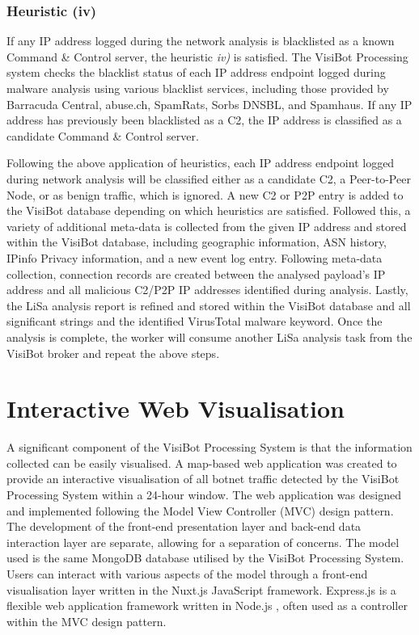 \subsubsection{Heuristic (iv)} If any IP address logged during the network analysis is blacklisted as a known Command \& Control server, the heuristic \textit{iv)} is satisfied. The VisiBot Processing system checks the blacklist status of each IP address endpoint logged during malware analysis using various blacklist services, including those provided by Barracuda Central, abuse.ch, SpamRats, Sorbs DNSBL, and Spamhaus. \cite{BarracudaCentral, AbuseCh, Spamrats, SorbsDnsbl, SpamhausZen} If any IP address has previously been blacklisted as a C2,  the IP address is classified as a candidate Command \& Control server.

Following the above application of heuristics, each IP address endpoint logged during network analysis will be classified either as a candidate C2, a Peer-to-Peer Node, or as benign traffic, which is ignored. A new C2 or P2P entry is added to the VisiBot database depending on which heuristics are satisfied. Followed this, a variety of additional meta-data is collected from the given IP address and stored within the VisiBot database, including geographic information, ASN history, IPinfo Privacy information, and a new event log entry. Following meta-data collection, connection records are created between the analysed payload's IP address and all malicious C2/P2P IP addresses identified during analysis. Lastly, the LiSa analysis report is refined and stored within the VisiBot database and all significant strings and the identified VirusTotal malware keyword. Once the analysis is complete, the worker will consume another LiSa analysis task from the VisiBot broker and repeat the above steps.



\section{Interactive Web Visualisation}

A significant component of the VisiBot Processing System is that the information collected can be easily visualised. A map-based web application was created to provide an interactive visualisation of all botnet traffic detected by the VisiBot Processing System within a 24-hour window. The web application was designed and implemented following the Model View Controller (MVC) design pattern. The development of the front-end presentation layer and back-end data interaction layer are separate, allowing for a separation of concerns. The model used is the same MongoDB database \citep{MongoDB} utilised by the VisiBot Processing System. Users can interact with various aspects of the model through a front-end visualisation layer written in the Nuxt.js \cite{NuxtJS} JavaScript framework. Express.js \citep{ExpressJS} is a flexible web application framework written in Node.js \citep{NodeJS}, often used as a controller within the MVC design pattern.

